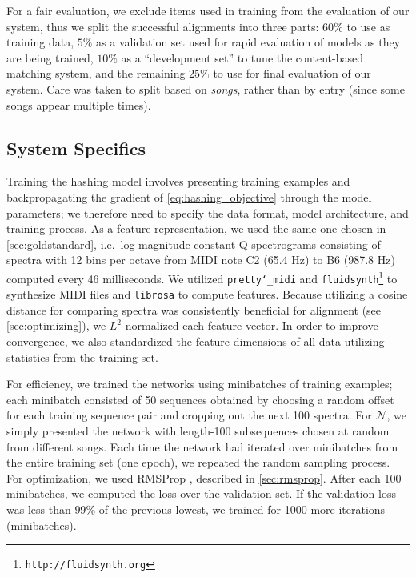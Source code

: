 For a fair evaluation, we exclude items used in training from the evaluation of our system, thus we split the successful alignments into three parts: $60\%$ to use as training data, $5\%$ as a validation set used for rapid evaluation of models as they are being trained, $10\%$ as a ``development set'' to tune the content-based matching system, and the remaining $25\%$ to use for final evaluation of our system.
Care was taken to split based on \textit{songs}, rather than by entry (since some songs appear multiple times).

\subsection{System Specifics}
\label{sec:hashing_system}

Training the hashing model involves presenting training examples and backpropagating the gradient of \cref{eq:hashing_objective} through the model parameters; we therefore need to specify the data format, model architecture, and training process.
As a feature representation, we used the same one chosen in \cref{sec:goldstandard}, i.e.\ log-magnitude constant-Q spectrograms consisting of spectra with 12 bins per octave from MIDI note C2 (65.4 Hz) to B6 (987.8 Hz) computed every 46 milliseconds.
We utilized \texttt{pretty\char`_midi} \cite{raffel2014pretty_midi} and \texttt{fluidsynth}\footnote{\texttt{http://fluidsynth.org}} to synthesize MIDI files and \texttt{librosa} \cite{mcfee2015librosa, mcfee2015librosa_scipy} to compute features.
Because utilizing a cosine distance for comparing spectra was consistently beneficial for alignment (see \cref{sec:optimizing}), we $L^2$-normalized each feature vector.
In order to improve convergence, we also standardized the feature dimensions of all data utilizing statistics from the training set.

For efficiency, we trained the networks using minibatches of training examples; each minibatch consisted of 50 sequences obtained by choosing a random offset for each training sequence pair and cropping out the next 100 spectra.
For $\mathcal{N}$, we simply presented the network with length-100 subsequences chosen at random from different songs.
Each time the network had iterated over minibatches from the entire training set (one epoch), we repeated the random sampling process.
For optimization, we used RMSProp \cite{tieleman2012lecture}, described in \cref{sec:rmsprop}.
After each 100 minibatches, we computed the loss over the validation set.
If the validation loss was less than $99\%$ of the previous lowest, we trained for 1000 more iterations (minibatches).

